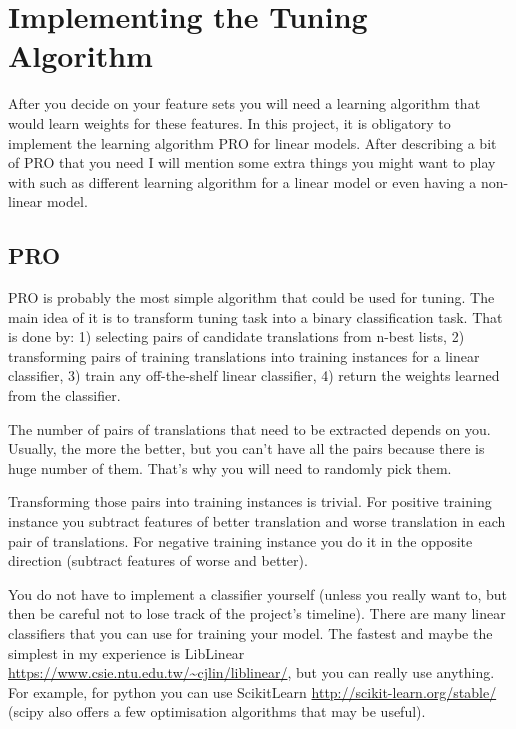 
\section{Implementing the Tuning Algorithm}

After you decide on your feature sets you will need a learning algorithm that would learn weights for these features. 
In this project, it is obligatory to implement the learning algorithm PRO for linear models. After describing a bit of PRO that you need I will mention some extra things you might want to play with such as different learning algorithm for a linear model or even having a non-linear model.

\subsection{PRO}

PRO is probably the most simple algorithm that could be used for tuning. The main idea of it is to transform tuning task into a binary classification task. That is done by: 1) selecting pairs of candidate translations from n-best lists, 2) transforming pairs of training translations into training instances for a linear classifier, 3) train any off-the-shelf linear classifier, 4) return the weights learned from the classifier.

The number of pairs of translations that need to be extracted depends on you. Usually, the more the better, but you can't have all the pairs because there is huge number of them. That's why you will need to randomly pick them.

Transforming those pairs into training instances is trivial. For positive training instance you subtract features of better translation and worse translation in each pair of translations. For negative training instance you do it in the opposite direction (subtract features of worse and better).


You do not have to implement a classifier yourself (unless you really want to, but then be careful not to lose track of the project's timeline).
There are many linear classifiers that you can use for training your model.
The fastest and maybe the simplest in my experience is LibLinear \url{https://www.csie.ntu.edu.tw/~cjlin/liblinear/}, but you can really use anything. For example, for python you can use ScikitLearn \url{http://scikit-learn.org/stable/} (scipy also offers a few optimisation algorithms that may be useful).



